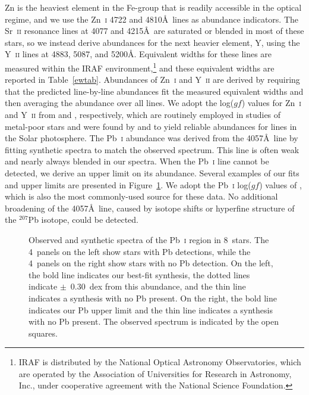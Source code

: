 \documentclass{emulateapj}
\begin{document}
Zn is the heaviest element in the Fe-group that is readily
accessible in the optical regime, and we use the
Zn~\textsc{i} 4722 and 4810\AA\ lines as abundance indicators.
The Sr~\textsc{ii} resonance lines at 4077 and 4215\AA\ are 
saturated or blended in most of these stars, so we instead
derive abundances for the next heavier element, Y, 
using the Y~\textsc{ii} lines at 4883, 5087, and 5200\AA.
Equivalent widths for these lines are measured within
the IRAF environment,\footnote{
IRAF is distributed by the National Optical Astronomy Observatories,
which are operated by the Association of Universities for Research
in Astronomy, Inc., under cooperative agreement with the National
Science Foundation.}
and these equivalent widths are reported in Table~\ref{ewtab}.
Abundances of Zn~\textsc{i} and Y~\textsc{ii} are derived 
by requiring that the predicted line-by-line abundances fit the
measured equivalent widths and then averaging the abundance over all lines.
We adopt the log($gf$) values for Zn~\textsc{i} and Y~\textsc{ii} 
from \citet{biemont80} and \citet{hannaford82}, respectively,
which are routinely employed in studies of metal-poor stars and
were found by \citet{biemont80} and \citet{hannaford82} to
yield reliable abundances for lines in the Solar photosphere.
The Pb~\textsc{i} abundance was derived from the 4057\AA\ line by
fitting synthetic spectra to match the observed spectrum.
This line is often weak and nearly always blended in our spectra.
When the Pb~\textsc{i} line cannot be detected, we derive an
upper limit on its abundance.
Several examples of our fits and upper limits are presented in
Figure~\ref{pbspecplot}.
We adopt the Pb~\textsc{i} log($gf$) values of \citet{biemont00},
which is also the most commonly-used source for these data.
No additional broadening of the 4057\AA\ line,
caused by isotope shifts or hyperfine structure of the $^{207}$Pb isotope,
could be detected.

\begin{figure}
\begin{center}
\end{center}
\caption{
\label{pbspecplot}
Observed and synthetic spectra of the Pb~\textsc{i} region
in 8~stars.
The 4~panels on the left show stars with Pb detections, while
the 4~panels on the right show stars with no Pb detection.
On the left, the bold line indicates our best-fit synthesis,
the dotted lines indicate $\pm$~0.30~dex from this abundance,
and the thin line indicates a synthesis with no Pb present.
On the right, the bold line indicates our Pb upper limit
and the thin line indicates a synthesis with no Pb present.
The observed spectrum is indicated by the open squares.
}
\end{figure}
\end{document}

